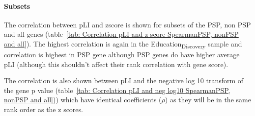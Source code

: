 \paragraph{Subsets}


The correlation between pLI and zscore is shown for subsets of the PSP, non PSP and all genes (table~\ref{tab: Correlation pLI and z score SpearmanPSP, nonPSP and all}). The highest correlation is again in the Education\textsubscript{Discovery} sample and correlation is highest in PSP gene although PSP genes do have higher average pLI (although this shouldn't affect their rank correlation with gene score). 

The correlation is also shown between pLI and the negative log 10 transform of the gene p value (table~\ref{tab: Correlation pLI and neg log10 SpearmanPSP, nonPSP and all})) which have identical coefficients ($\rho$) as they will be in the same rank order as the z scores. 









